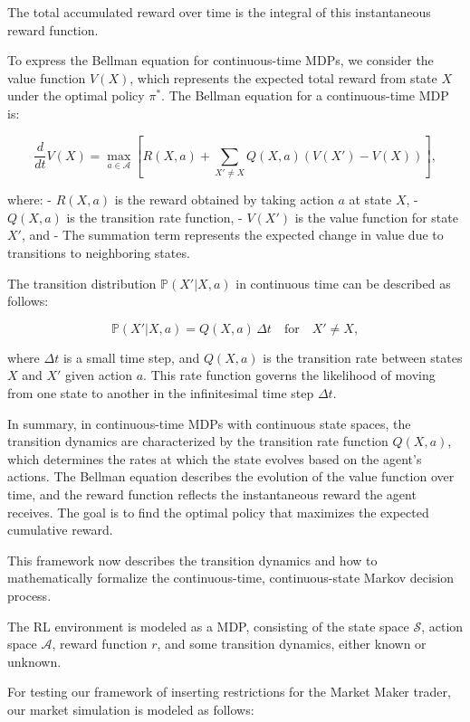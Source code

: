 The total accumulated reward over time is the integral of this instantaneous reward function.

To express the Bellman equation for continuous-time MDPs, we consider the value function \( V(X) \), which represents the expected total reward from state \( X \) under the optimal policy \( \pi^* \). The Bellman equation for a continuous-time MDP is:

$$
\frac{d}{dt} V(X) = \max_{a \in \mathcal{A}} \left[ R(X, a) + \sum_{X' \neq X} Q(X, a) \left( V(X') - V(X) \right) \right],
$$

where:
- \( R(X, a) \) is the reward obtained by taking action \( a \) at state \( X \),
- \( Q(X, a) \) is the transition rate function,
- \( V(X') \) is the value function for state \( X' \), and
- The summation term represents the expected change in value due to transitions to neighboring states.

The transition distribution \( \mathbb{P}(X' | X, a) \) in continuous time can be described as follows:

$$
\mathbb{P}(X' | X, a) = Q(X, a) \, \Delta t \quad \text{for} \quad X' \neq X,
$$

where \( \Delta t \) is a small time step, and \( Q(X, a) \) is the transition rate between states \( X \) and \( X' \) given action \( a \). This rate function governs the likelihood of moving from one state to another in the infinitesimal time step \( \Delta t \).

In summary, in continuous-time MDPs with continuous state spaces, the transition dynamics are characterized by the transition rate function \( Q(X, a) \), which determines the rates at which the state evolves based on the agent’s actions. The Bellman equation describes the evolution of the value function over time, and the reward function reflects the instantaneous reward the agent receives. The goal is to find the optimal policy that maximizes the expected cumulative reward.

This framework now describes the transition dynamics and how to mathematically formalize the continuous-time, continuous-state Markov decision process.

The RL environment is modeled as a MDP, consisting of the state space \( \mathcal{S} \), action space \( \mathcal{A} \), reward function \( r \), and some transition dynamics, either known or unknown. 

For testing our framework of inserting restrictions for the Market Maker trader, our market simulation is modeled as follows:

